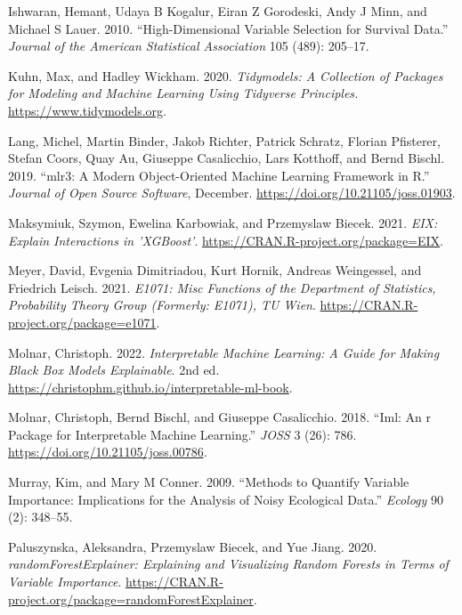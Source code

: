 \begin{CSLReferences}{1}{0}
\leavevmode{}%
Ishwaran, Hemant, Udaya B Kogalur, Eiran Z Gorodeski, Andy J Minn, and Michael S Lauer. 2010. {``High-Dimensional Variable Selection for Survival Data.''} \emph{Journal of the American Statistical Association} 105 (489): 205--17.

\leavevmode{}%
Kuhn, Max, and Hadley Wickham. 2020. \emph{Tidymodels: A Collection of Packages for Modeling and Machine Learning Using Tidyverse Principles.} \url{https://www.tidymodels.org}.

\leavevmode{}%
Lang, Michel, Martin Binder, Jakob Richter, Patrick Schratz, Florian Pfisterer, Stefan Coors, Quay Au, Giuseppe Casalicchio, Lars Kotthoff, and Bernd Bischl. 2019. {``{mlr3}: A Modern Object-Oriented Machine Learning Framework in {R}.''} \emph{Journal of Open Source Software}, December. \url{https://doi.org/10.21105/joss.01903}.

\leavevmode{}%
Maksymiuk, Szymon, Ewelina Karbowiak, and Przemyslaw Biecek. 2021. \emph{EIX: Explain Interactions in 'XGBoost'}. \url{https://CRAN.R-project.org/package=EIX}.

\leavevmode{}%
Meyer, David, Evgenia Dimitriadou, Kurt Hornik, Andreas Weingessel, and Friedrich Leisch. 2021. \emph{E1071: Misc Functions of the Department of Statistics, Probability Theory Group (Formerly: E1071), TU Wien}. \url{https://CRAN.R-project.org/package=e1071}.

\leavevmode{}%
Molnar, Christoph. 2022. \emph{Interpretable Machine Learning: A Guide for Making Black Box Models Explainable}. 2nd ed. \url{https://christophm.github.io/interpretable-ml-book}.

\leavevmode{}%
Molnar, Christoph, Bernd Bischl, and Giuseppe Casalicchio. 2018. {``Iml: An r Package for Interpretable Machine Learning.''} \emph{JOSS} 3 (26): 786. \url{https://doi.org/10.21105/joss.00786}.

\leavevmode{}%
Murray, Kim, and Mary M Conner. 2009. {``Methods to Quantify Variable Importance: Implications for the Analysis of Noisy Ecological Data.''} \emph{Ecology} 90 (2): 348--55.

\leavevmode{}%
Paluszynska, Aleksandra, Przemyslaw Biecek, and Yue Jiang. 2020. \emph{randomForestExplainer: Explaining and Visualizing Random Forests in Terms of Variable Importance}. \url{https://CRAN.R-project.org/package=randomForestExplainer}.


\end{CSLReferences}
